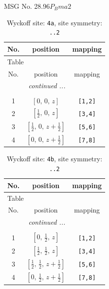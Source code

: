 \documentclass[fleqn,8pt]{jsarticle}
\begin{document}
\setcounter{MaxMatrixCols}{32}

\renewcommand{\tablename}{Table~}
\renewcommand{\figurename}{Figure~}
\begin{center}
\LARGE
MSG No. 28.96\quad$P_{B}ma2$
\end{center}
\renewcommand{\arraystretch}{1.2}
\begin{longtable}{ccc}
\caption{Wyckoff site: {\tt 4a}, site symmetry: {\tt ..2}}
 \\
 \hline \hline
No. & position & mapping \\ \hline \endfirsthead

\multicolumn{2}{l}{\tablename\ \thetable{}} \\
 \hline \hline
No. & position & mapping \\ \hline \endhead

 \hline \hline
\multicolumn{2}{r}{\footnotesize\it continued ...} \\ \endfoot

 \hline \hline
\multicolumn{2}{r}{} \\ \endlastfoot

1 & $\left[ 0,\, 0,\, z \right]$ & {\tt [1,2]} \\ \hline
2 & $\left[ \frac{1}{2},\, 0,\, z \right]$ & {\tt [3,4]} \\ \hline
3 & $\left[ \frac{1}{2},\, 0,\, z + \frac{1}{2} \right]$ & {\tt [5,6]} \\ \hline
4 & $\left[ 0,\, 0,\, z + \frac{1}{2} \right]$ & {\tt [7,8]} \\
\end{longtable}
\renewcommand{\arraystretch}{1.2}
\begin{longtable}{ccc}
\caption{Wyckoff site: {\tt 4b}, site symmetry: {\tt ..2}}
 \\
 \hline \hline
No. & position & mapping \\ \hline \endfirsthead

\multicolumn{2}{l}{\tablename\ \thetable{}} \\
 \hline \hline
No. & position & mapping \\ \hline \endhead

 \hline \hline
\multicolumn{2}{r}{\footnotesize\it continued ...} \\ \endfoot

 \hline \hline
\multicolumn{2}{r}{} \\ \endlastfoot

1 & $\left[ 0,\, \frac{1}{2},\, z \right]$ & {\tt [1,2]} \\ \hline
2 & $\left[ \frac{1}{2},\, \frac{1}{2},\, z \right]$ & {\tt [3,4]} \\ \hline
3 & $\left[ \frac{1}{2},\, \frac{1}{2},\, z + \frac{1}{2} \right]$ & {\tt [5,6]} \\ \hline
4 & $\left[ 0,\, \frac{1}{2},\, z + \frac{1}{2} \right]$ & {\tt [7,8]} \\
\end{longtable}
\end{document}
